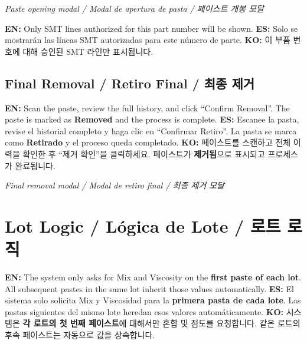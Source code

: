 \documentclass[12pt,a4paper]{article}
\newcommand{\tri}[3]{%
  \textbf{EN:} #1 \quad\textbar\quad \textbf{ES:} #2 \quad\textbar\quad \textbf{KO:} #3%
}
\begin{document}
\begin{photobox}
\centering
\vspace{3.5cm}
\textit{Paste opening modal / Modal de apertura de pasta / 페이스트 개봉 모달}
\vspace{0.5cm}
\end{photobox}

\begin{tipbox}
\tri{Only SMT lines authorized for this part number will be shown.}
{Solo se mostrarán las líneas SMT autorizadas para este número de parte.}
{이 부품 번호에 대해 승인된 SMT 라인만 표시됩니다.}
\end{tipbox}

\subsection{Final Removal / Retiro Final / 최종 제거}

\tri{Scan the paste, review the full history, and click ``Confirm Removal''. The paste is marked as \textbf{Removed} and the process is complete.}
{Escanee la pasta, revise el historial completo y haga clic en ``Confirmar Retiro''. La pasta se marca como \textbf{Retirado} y el proceso queda completado.}
{페이스트를 스캔하고 전체 이력을 확인한 후 ``제거 확인''을 클릭하세요. 페이스트가 \textbf{제거됨}으로 표시되고 프로세스가 완료됩니다.}

\begin{photobox}
\centering
\vspace{3.5cm}
\textit{Final removal modal / Modal de retiro final / 최종 제거 모달}
\vspace{0.5cm}
\end{photobox}

\section{Lot Logic / Lógica de Lote / 로트 로직}

\begin{warningbox}
\tri{The system only asks for Mix and Viscosity on the \textbf{first paste of each lot}. All subsequent pastes in the same lot inherit those values automatically.}
{El sistema solo solicita Mix y Viscosidad para la \textbf{primera pasta de cada lote}. Las pastas siguientes del mismo lote heredan esos valores automáticamente.}
{시스템은 \textbf{각 로트의 첫 번째 페이스트}에 대해서만 혼합 및 점도를 요청합니다. 같은 로트의 후속 페이스트는 자동으로 값을 상속합니다.}
\end{warningbox}
\end{document}
